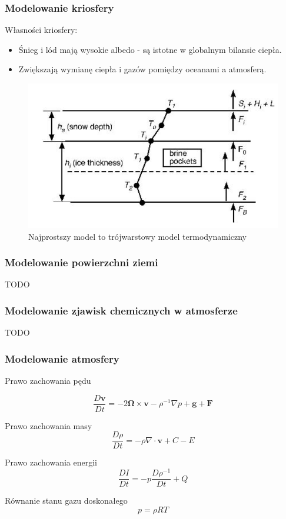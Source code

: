 \documentclass{beamer}
\begin{document}
\begin{frame}
	\frametitle{Modelowanie kriosfery}
	Własności kriosfery:
\begin{itemize}
	\item Śnieg i lód mają wysokie albedo - są istotne w globalnym bilansie ciepła. 
	\item Zwiększają wymianę ciepła i gazów pomiędzy oceanami a atmosferą.
\end{itemize}
	\begin{figure}[h]
		\begin{center}
			\includegraphics[width=0.6\linewidth]{images/Figure7.png}
			\caption{Najprostszy model to trójwarstowy model termodynamiczny}
		\end{center}
	\end{figure}
	
\end{frame}


\begin{frame}
	\frametitle{Modelowanie powierzchni ziemi}
	TODO
	
\end{frame}


\begin{frame}
	\frametitle{Modelowanie zjawisk chemicznych w atmosferze}
	TODO
	
\end{frame}



\begin{frame}
	\frametitle{Modelowanie atmosfery}
	\begin{block}{Prawo zachowania pędu}
		
		\[\frac{D\mathbf{v}}{Dt} = -2 \mathbf{\Omega} \times \mathbf{v} - \rho^{-1}
		\nabla p + \mathbf{g} + \mathbf{F}
		\]
		
	\end{block}
	
	\begin{block}{Prawo zachowania masy}
		\[\frac{D\rho}{Dt} = -\rho\nabla \cdot \mathbf{v} + C - E
		\]
	\end{block}
	
	\begin{block}{Prawo zachowania energii}
		\[\frac{DI}{Dt} = -p\frac{D\rho^{-1}}{Dt} + Q
		\]
	\end{block}
	
	\begin{block}{Równanie stanu gazu doskonałego}		
		\[p=\rho RT
		\]
	\end{block}
	
	
\end{frame}
\end{document}
